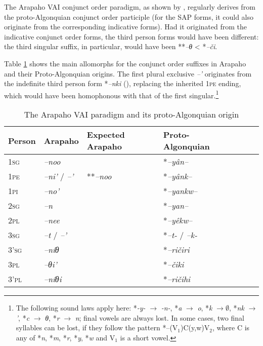\documentclass[twoside,a4paper,11pt]{article}
\newcommand{\ipa}[1]{{\phon\textit{#1}}}
\newcommand{\sg}{\textsc{sg}}
\newcommand{\pl}{\textsc{pl}}
\newcommand{\grise}[1]{\cellcolor{lightgray}\textbf{#1}}
\newcommand{\pli}{\textsc{pi}}
\newcommand{\pe}{\textsc{pe}}
\begin{document}
The Arapaho VAI conjunct order paradigm, as shown by \citet[16-7]{goddard65arapaho}, regularly derives from the proto-Algonquian conjunct order participle (for the SAP forms, it could also originate from the corresponding indicative forms). Had it originated from the indicative conjunct order forms, the third person forms would have been different: the third singular suffix, in particular, would have been **\ipa{--θ} < *\ipa{--či}.

Table \ref{tab:arapaho.vai} shows the main  allomorphs for the conjunct order suffixes in Arapaho and their Proto-Algonquian origins. The first plural exclusive \ipa{--'} originates from the indefinite third person form *\ipa{--nki} (\citealt{goddard98morphology.arapaho}), replacing the inherited 1\pe{} ending, which would have been homophonous with that of the first singular.\footnote{The following sound laws apply here: *\ipa{-y-} $\rightarrow$ \ipa{-n-}, *\ipa{a} $\rightarrow$ \ipa{o}, *\ipa{k} $\rightarrow \emptyset $, *\ipa{nk} $\rightarrow$ \ipa{'}, *\ipa{c} $\rightarrow$ \ipa{θ},  *\ipa{r} $\rightarrow$ \ipa{n}; final vowels are always lost. In some cases, two final syllables can be lost, if they follow the pattern *--(V${_1}$)C(y,w)V${_2}$, where C is any of *\ipa{n}, *\ipa{m}, *\ipa{r}, *\ipa{y}, *\ipa{w} and V${_1}$ is a short vowel. }


\begin{table}[H]
\caption{The Arapaho VAI paradigm and its proto-Algonquian origin}
\centering \label{tab:arapaho.vai}
\begin{tabular}{lllllll}
\toprule
Person &   Arapaho    & Expected Arapaho &Proto-Algonquian\\
\midrule
1\sg{}& 	\ipa{--noo} & & 	*\ipa{--yân--} & 	\\	
1\pe{} & 	\ipa{--ni'} /  	\ipa{--'} \grise{} & **\ipa{--noo}	&	 *\ipa{--yânk--}	 \\	
1\pli{} & 	\ipa{--no'} & 	 	&	*\ipa{--yankw--} & 	\\	
\midrule
2\sg{}& 	\ipa{--n} & 	 &	*\ipa{--yan--} & 	\\	
2\pl{}& 	\ipa{--nee} & 	 & 		*\ipa{--yêkw--} & 	\\	
\midrule
3\sg{} & 	\ipa{--t} /	\ipa{--'} & 	&	*\ipa{--t-} / \ipa{--k-}& 	\\	
3'\sg{} & 	\ipa{--níθ} &  	&	*\ipa{--ričiri} & 	\\	
3\pl{}& 	\ipa{--θi'} &  	&	*\ipa{--čiki} 	\\	
3'\pl{}& 	\ipa{--níθi} & 	 &		*\ipa{--ričihi} 	\\	
\bottomrule
\end{tabular}
\end{table}
\end{document}
